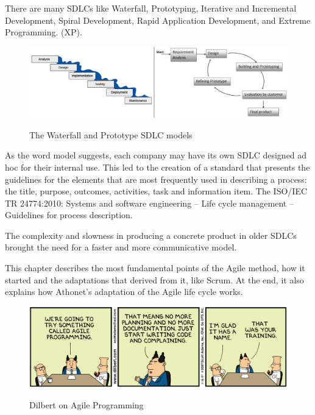 There are many SDLCs like Waterfall, Prototyping, Iterative and Incremental Development, Spiral Development, Rapid Application Development, and Extreme Programming. (XP). 

\begin{figure}[H]
	\centering
	\includegraphics[width=\textwidth]{resources/warterfall_prototype}\\
	\caption{The Waterfall and Prototype SDLC models}
\end{figure}

As the word model suggests, each company may have its own SDLC designed ad hoc for their internal use.
This led to the creation of a standard that presents the guidelines for the elements that are most frequently used in describing a process: the title, purpose, outcomes, activities, task and information item.
The ISO/IEC TR 24774:2010: Systems and software engineering -- Life cycle management -- Guidelines for process description. %

The complexity and slowness in producing a concrete product in older SDLCs brought the need for a faster and more communicative model.


This chapter describes the most fundamental points of the Agile method, how it started and the adaptations that derived from it, like Scrum.
At the end, it also explains how Athonet's adaptation of the Agile life cycle works.

\begin{figure}[H]
	\centering
	\includegraphics[width=\textwidth]{resources/Dilbert_Training_Agile_Programming}\\
	\caption{Dilbert on Agile Programming}
\end{figure}

